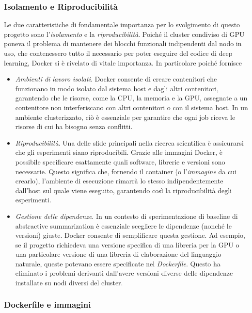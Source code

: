 \documentclass[12pt,a4paper,twoside,openright]{book}
\begin{document}
\subsubsection{Isolamento e Riproducibilità}
Le due caratteristiche di fondamentale importanza per lo svolgimento di questo progetto sono l'\emph{isolamento} e la \emph{riproducibilità}. Poiché il cluster condiviso di GPU poneva il problema di mantenere dei blocchi funzionali indipendenti dal nodo in uso, che contenessero tutto il necessario per poter eseguire del codice di deep learning, Docker si è rivelato di vitale importanza. In particolare poiché fornisce
\begin{itemize}
    \item \emph{Ambienti di lavoro isolati}. Docker consente di creare contenitori che funzionano in modo isolato dal sistema host e dagli altri contenitori, garantendo che le risorse, come la CPU, la memoria e la GPU, assegnate a un contenitore non interferiscano con altri contenitori o con il sistema host. In un ambiente clusterizzato, ciò è essenziale per garantire che ogni job riceva le risorse di cui ha bisogno senza conflitti.
    \item \emph{Riproducibilità}. Una delle sfide principali nella ricerca scientifica è assicurarsi che gli esperimenti siano riproducibili. Grazie alle immagini Docker, è possibile specificare esattamente quali software, librerie e versioni sono necessarie. Questo significa che, fornendo il container (o l'\emph{immagine} da cui crearlo), l'ambiente di esecuzione rimarrà lo stesso indipendentemente dall'host sul quale viene eseguito, garantendo così la riproducibilità degli esperimenti.

    \item \emph{Gestione delle dipendenze}. In un contesto di sperimentazione di baseline di abstractive summarization è essenziale scegliere le dipendenze (nonché le versioni) giuste. Docker consente di semplificare questa gestione. Ad esempio, se il progetto richiedeva una versione specifica di una libreria per la GPU o una particolare versione di una libreria di elaborazione del linguaggio naturale, queste potevano essere specificate nel \emph{Dockerfile}. Questo ha eliminato i problemi derivanti dall'avere versioni diverse delle dipendenze installate su nodi diversi del cluster.
\end{itemize}


\subsubsection{Dockerfile e immagini}
\end{document}
